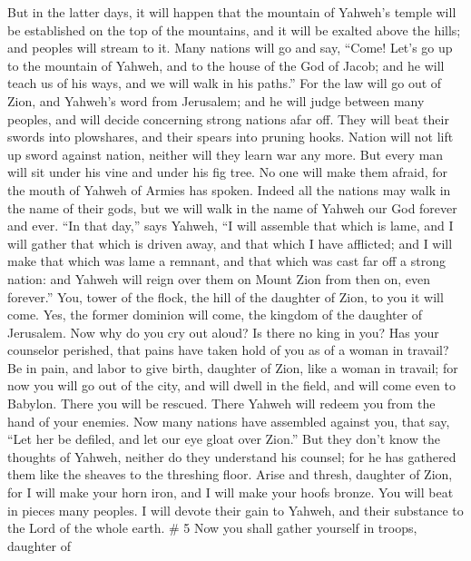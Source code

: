  But in the latter days, it will happen that the mountain
of Yahweh's temple will be established on the top of the mountains, and
it will be exalted above the hills; and peoples will stream to it.
 Many nations will go and say, ``Come! Let's go up to the
mountain of Yahweh, and to the house of the God of Jacob; and he will
teach us of his ways, and we will walk in his paths.'' For the law will
go out of Zion, and Yahweh's word from Jerusalem;  and he
will judge between many peoples, and will decide concerning strong
nations afar off. They will beat their swords into plowshares, and their
spears into pruning hooks. Nation will not lift up sword against nation,
neither will they learn war any more.  But every man will
sit under his vine and under his fig tree. No one will make them afraid,
for the mouth of Yahweh of Armies has spoken.  Indeed all
the nations may walk in the name of their gods, but we will walk in the
name of Yahweh our God forever and ever.  ``In that day,''
says Yahweh, ``I will assemble that which is lame, and I will gather
that which is driven away, and that which I have afflicted;
 and I will make that which was lame a remnant, and that
which was cast far off a strong nation: and Yahweh will reign over them
on Mount Zion from then on, even forever.''  You, tower of
the flock, the hill of the daughter of Zion, to you it will come. Yes,
the former dominion will come, the kingdom of the daughter of Jerusalem.
 Now why do you cry out aloud? Is there no king in you?
Has your counselor perished, that pains have taken hold of you as of a
woman in travail?  Be in pain, and labor to give birth,
daughter of Zion, like a woman in travail; for now you will go out of
the city, and will dwell in the field, and will come even to Babylon.
There you will be rescued. There Yahweh will redeem you from the hand of
your enemies.  Now many nations have assembled against
you, that say, ``Let her be defiled, and let our eye gloat over Zion.''
 But they don't know the thoughts of Yahweh, neither do
they understand his counsel; for he has gathered them like the sheaves
to the threshing floor.  Arise and thresh, daughter of
Zion, for I will make your horn iron, and I will make your hoofs bronze.
You will beat in pieces many peoples. I will devote their gain to
Yahweh, and their substance to the Lord of the whole earth. \# 5
 Now you shall gather yourself in troops, daughter of
